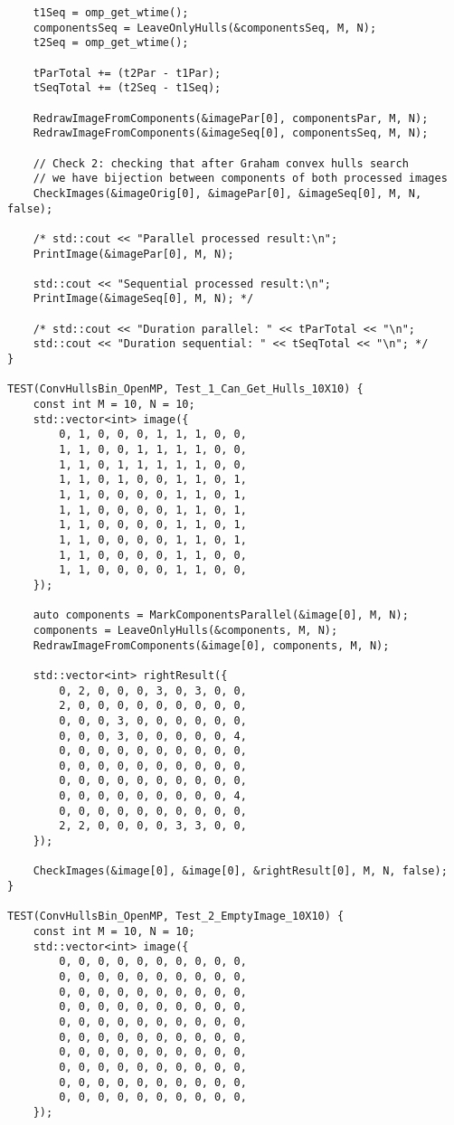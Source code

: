 \documentclass[14pt, russian]{extarticle}
\begin{document}
\begin{lstlisting}
	t1Seq = omp_get_wtime();
	componentsSeq = LeaveOnlyHulls(&componentsSeq, M, N);
	t2Seq = omp_get_wtime();
	
	tParTotal += (t2Par - t1Par);
	tSeqTotal += (t2Seq - t1Seq);
	
	RedrawImageFromComponents(&imagePar[0], componentsPar, M, N);
	RedrawImageFromComponents(&imageSeq[0], componentsSeq, M, N);
	
	// Check 2: checking that after Graham convex hulls search
	// we have bijection between components of both processed images
	CheckImages(&imageOrig[0], &imagePar[0], &imageSeq[0], M, N, false);
	
	/* std::cout << "Parallel processed result:\n";
	PrintImage(&imagePar[0], M, N);
	
	std::cout << "Sequential processed result:\n";
	PrintImage(&imageSeq[0], M, N); */
	
	/* std::cout << "Duration parallel: " << tParTotal << "\n";
	std::cout << "Duration sequential: " << tSeqTotal << "\n"; */
}

TEST(ConvHullsBin_OpenMP, Test_1_Can_Get_Hulls_10X10) {
	const int M = 10, N = 10;
	std::vector<int> image({
		0, 1, 0, 0, 0, 1, 1, 1, 0, 0,
		1, 1, 0, 0, 1, 1, 1, 1, 0, 0,
		1, 1, 0, 1, 1, 1, 1, 1, 0, 0,
		1, 1, 0, 1, 0, 0, 1, 1, 0, 1,
		1, 1, 0, 0, 0, 0, 1, 1, 0, 1,
		1, 1, 0, 0, 0, 0, 1, 1, 0, 1,
		1, 1, 0, 0, 0, 0, 1, 1, 0, 1,
		1, 1, 0, 0, 0, 0, 1, 1, 0, 1,
		1, 1, 0, 0, 0, 0, 1, 1, 0, 0,
		1, 1, 0, 0, 0, 0, 1, 1, 0, 0,
	});
	
	auto components = MarkComponentsParallel(&image[0], M, N);
	components = LeaveOnlyHulls(&components, M, N);
	RedrawImageFromComponents(&image[0], components, M, N);
	
	std::vector<int> rightResult({
		0, 2, 0, 0, 0, 3, 0, 3, 0, 0,
		2, 0, 0, 0, 0, 0, 0, 0, 0, 0,
		0, 0, 0, 3, 0, 0, 0, 0, 0, 0,
		0, 0, 0, 3, 0, 0, 0, 0, 0, 4,
		0, 0, 0, 0, 0, 0, 0, 0, 0, 0,
		0, 0, 0, 0, 0, 0, 0, 0, 0, 0,
		0, 0, 0, 0, 0, 0, 0, 0, 0, 0,
		0, 0, 0, 0, 0, 0, 0, 0, 0, 4,
		0, 0, 0, 0, 0, 0, 0, 0, 0, 0,
		2, 2, 0, 0, 0, 0, 3, 3, 0, 0,
	});
	
	CheckImages(&image[0], &image[0], &rightResult[0], M, N, false);
}

TEST(ConvHullsBin_OpenMP, Test_2_EmptyImage_10X10) {
	const int M = 10, N = 10;
	std::vector<int> image({
		0, 0, 0, 0, 0, 0, 0, 0, 0, 0,
		0, 0, 0, 0, 0, 0, 0, 0, 0, 0,
		0, 0, 0, 0, 0, 0, 0, 0, 0, 0,
		0, 0, 0, 0, 0, 0, 0, 0, 0, 0,
		0, 0, 0, 0, 0, 0, 0, 0, 0, 0,
		0, 0, 0, 0, 0, 0, 0, 0, 0, 0,
		0, 0, 0, 0, 0, 0, 0, 0, 0, 0,
		0, 0, 0, 0, 0, 0, 0, 0, 0, 0,
		0, 0, 0, 0, 0, 0, 0, 0, 0, 0,
		0, 0, 0, 0, 0, 0, 0, 0, 0, 0,
	});
	

\end{lstlisting}
\end{document}
